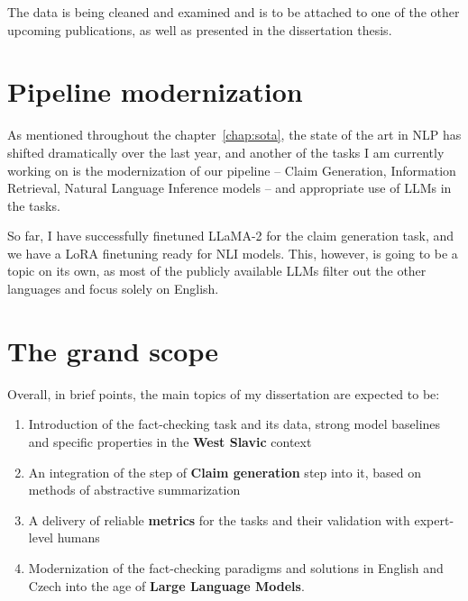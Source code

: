 The data is being cleaned and examined and is to be attached to one of the other upcoming publications, as well as presented in the dissertation thesis.

\section{Pipeline modernization}
As mentioned throughout the chapter~\ref{chap:sota}, the state of the art in NLP has shifted dramatically over the last year, and another of the tasks I am currently working on is the modernization of our pipeline -- Claim Generation, Information Retrieval, Natural Language Inference models -- and appropriate use of LLMs in the tasks.

So far, I have successfully finetuned LLaMA-2 for the claim generation task, and we have a LoRA finetuning ready for NLI models. This, however, is going to be a topic on its own, as most of the publicly available LLMs filter out the other languages and focus solely on English.

\section{The grand scope}
Overall, in brief points, the main topics of my dissertation are expected to be:
\begin{enumerate}
    \item Introduction of the fact-checking task and its data, strong model baselines and specific properties in the \textbf{West Slavic} context
    \item An integration of the step of \textbf{Claim generation} step into it, based on methods of abstractive summarization 
    \item A delivery of reliable \textbf{metrics} for the tasks and their validation with expert-level humans
    \item Modernization of the fact-checking paradigms and solutions in English and Czech into the age of \textbf{Large Language Models}.
\end{enumerate}